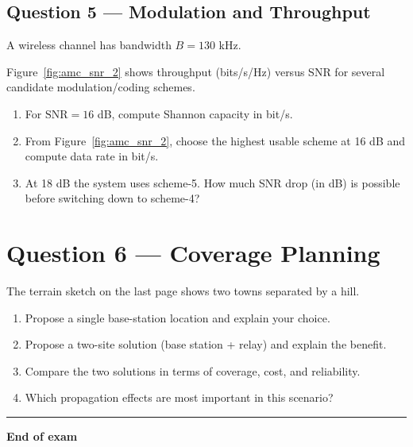 \documentclass[11pt,a4paper]{article}
\begin{document}
\subsection*{Question 5 --- Modulation and Throughput}
A wireless channel has bandwidth $B = 130$ kHz.

Figure~\ref{fig:amc_snr_2} shows throughput (bits/s/Hz) versus SNR for several candidate modulation/coding schemes.

\FloatBarrier

\begin{enumerate}[label=\alph*)]
    \item For $\mathrm{SNR}=16$ dB, compute Shannon capacity in bit/s.
    \item From Figure~\ref{fig:amc_snr_2}, choose the highest usable scheme at 16 dB and compute data rate in bit/s.
    \item At 18 dB the system uses scheme-5. How much SNR drop (in dB) is possible before switching down to scheme-4?
\end{enumerate}

\section*{Question 6 --- Coverage Planning}
The terrain sketch on the last page shows two towns separated by a hill.

\begin{enumerate}[label=\alph*)]
    \item Propose a single base-station location and explain your choice.
    \item Propose a two-site solution (base station + relay) and explain the benefit.
    \item Compare the two solutions in terms of coverage, cost, and reliability.
    \item Which propagation effects are most important in this scenario?
\end{enumerate}

\vspace{0.6cm}
\hrule
\vspace{0.3cm}
\textbf{End of exam}


\clearpage
\label{LastPage}
\end{document}
